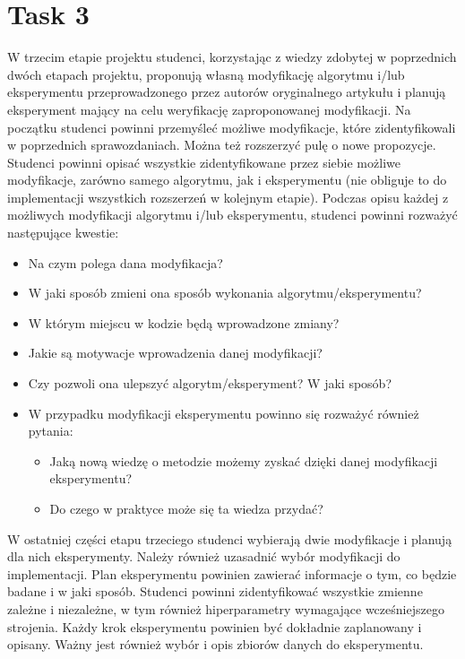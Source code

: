 \documentclass[a4paper]{LTJournalArticle}
\begin{document}
	\section{Task 3}
	W trzecim etapie projektu studenci, korzystając z wiedzy zdobytej 
	w poprzednich dwóch etapach projektu, proponują własną modyfikację algorytmu 
	i/lub eksperymentu przeprowadzonego przez autorów oryginalnego artykułu i 
	planują eksperyment mający na celu weryfikację zaproponowanej modyfikacji.
	Na początku studenci powinni przemyśleć możliwe modyfikacje, które 
	zidentyfikowali w poprzednich sprawozdaniach. Można też rozszerzyć pulę 
	o nowe propozycje. Studenci powinni opisać wszystkie zidentyfikowane przez 
	siebie możliwe modyfikacje, zarówno samego algorytmu, jak i eksperymentu (nie 
	obliguje to do implementacji wszystkich rozszerzeń w kolejnym etapie).
	Podczas opisu każdej z możliwych modyfikacji algorytmu i/lub 
	eksperymentu, studenci powinni rozważyć następujące kwestie:
	\begin{itemize}
		\item Na czym polega dana modyfikacja?
		\item W jaki sposób zmieni ona sposób wykonania algorytmu/eksperymentu?
		\item W którym miejscu w kodzie będą wprowadzone zmiany?
		\item Jakie są motywacje wprowadzenia danej modyfikacji?
		\item Czy pozwoli ona ulepszyć algorytm/eksperyment? W jaki sposób?
		\item W przypadku modyfikacji eksperymentu powinno się rozważyć również pytania:
		\begin{itemize}
			\item Jaką nową wiedzę o metodzie możemy zyskać dzięki danej modyfikacji eksperymentu?
			\item Do czego w praktyce może się ta wiedza przydać?
		\end{itemize}
	\end{itemize}
	W ostatniej części etapu trzeciego studenci wybierają dwie modyfikacje i 
	planują dla nich eksperymenty. Należy również uzasadnić wybór modyfikacji do 
	implementacji.
	Plan eksperymentu powinien zawierać informacje o tym, co będzie badane 
	i w jaki sposób. Studenci powinni zidentyfikować wszystkie zmienne zależne i
	niezależne, w tym również hiperparametry wymagające wcześniejszego 
	strojenia. Każdy krok eksperymentu powinien być dokładnie zaplanowany i 
	opisany. Ważny jest również wybór i opis zbiorów danych do eksperymentu.
\end{document}
